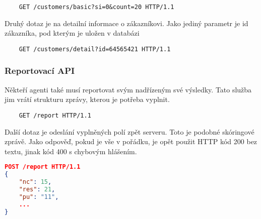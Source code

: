 \documentclass[11pt,twoside,a4paper]{book}
\begin{document}
\begin{minipage}{\linewidth}
\begin{verbatim}
	GET /customers/basic?si=0&count=20 HTTP/1.1
\end{verbatim}


\end{minipage}

Druhý dotaz je na detailní informace o zákazníkovi. Jako jediný parametr je id zákazníka, pod kterým je uložen v databázi

\begin{minipage}{\linewidth}
\begin{verbatim}
	GET /customers/detail?id=64565421 HTTP/1.1
\end{verbatim}


\end{minipage}

\subsubsection{Reportovací API} \label{sec:reportAPI}
Někteří agenti také musí reportovat svým nadřízeným své výsledky. Tato služba jim vrátí strukturu zprávy, kterou je potřeba vyplnit.

\begin{minipage}{\linewidth}
\begin{verbatim}
	GET /report HTTP/1.1
\end{verbatim}


\end{minipage}

Další dotaz je odeslání vyplněných polí zpět serveru. Toto je podobné skóringové zprávě. Jako odpověď, pokud je vše v pořádku, je opět použit HTTP kód 200 bez textu, jinak kód 400 s chybovým hlášením.

\begin{minipage}{\linewidth}
\begin{lstlisting}[caption={Příklad požadavku odeslání reportingu},language=json]
POST /report HTTP/1.1
{
	"nc": 15,
	"res": 21,
	"pu": "11",
	...
}
\end{lstlisting}
\end{minipage}
\end{document}
